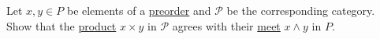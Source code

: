Let $x,y \in P$ be elements of a \hyperref[D1.30]{preorder} and $\mathcal{P}$ be the corresponding category. Show that the \hyperref[D3.86]{product} $x \times y$ in $\mathcal{P}$ agrees with their \hyperref[D1.81]{meet} $x \land y$ in $P$.